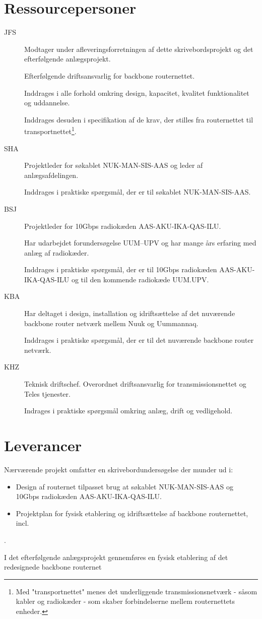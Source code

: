 \documentclass[11pt,a4paper]{article}
\begin{document}
\section{Ressourcepersoner}
\begin{description}
\item[JFS]
Modtager under afleveringsforretningen af dette skrivebordsprojekt og det efterfølgende anlægsprojekt.
\par
Efterfølgende driftsansvarlig for backbone routernettet.
\par
Inddrages i alle forhold omkring design, kapacitet, kvalitet funktionalitet og uddannelse.
\par
Inddrages desuden i specifikation af de krav, der stilles fra routernettet til transportnettet\footnote{Med "transportnettet" menes det underliggende transmissionsnetværk - såsom kabler og radiokæder - som skaber forbindelserne mellem routernettets enheder.}.
\item[SHA]
Projektleder for søkablet NUK-MAN-SIS-AAS og leder af anlægsafdelingen.
\par
Inddrages i praktiske spørgsmål, der er til søkablet NUK-MAN-SIS-AAS.
\item[BSJ]
Projektleder for 10Gbps radiokæden AAS-AKU-IKA-QAS-ILU.
\par
Har udarbejdet forundersøgelse UUM–UPV og har mange års erfaring med anlæg af radiokæder.
\par
Inddrages i praktiske spørgsmål, der er til 10Gbps radiokæden AAS-AKU-IKA-QAS-ILU og til den kommende radiokæde UUM.UPV.
\item[KBA]
Har deltaget i design, installation og idriftsættelse af det nuværende backbone router netværk mellem Nuuk og Uummannaq.
\par
Inddrages i praktiske spørgsmål, der er til det nuværende backbone router netværk.
\item[KHZ]
Teknisk driftschef. Overordnet driftsansvarlig for transmissionsnettet og Teles tjenester.
\par
Indrages i praktiske spørgsmål omkring anlæg, drift og vedligehold.
\end{description}
\section{Leverancer}
Nærværende projekt omfatter en skrivebordundersøgelse der munder ud i:
\begin{itemize}
\item Design af routernet tilpasset brug at søkablet NUK-MAN-SIS-AAS og 10Gbps radiokæden AAS-AKU-IKA-QAS-ILU.
\item Projektplan for fysisk etablering og idriftsættelse af backbone routernettet, incl.
\end{itemize}.
\par
I det efterfølgende anlægsprojekt gennemføres en fysisk etablering af det redesignede backbone routernet
\end{document}
